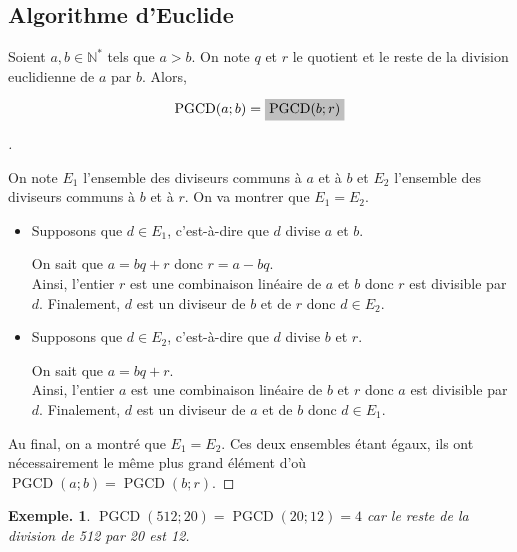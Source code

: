 \documentclass[12pt]{article}
\newcommand{\hideM}[1]{\mbox{\vphantom{$#1$}\smash{\colorbox{gray!50}{$\displaystyle #1$}}} }
\theoremstyle{break}
\newtheorem*{example}{Exemple.}
\newenvironment{demo}[1][\proofname]{%
  \begin{proof}[#1]$ $\newline
}{%
  \end{proof}
}
\begin{document}
\subsection{Algorithme d'Euclide}
\begin{proposition}{}{}
Soient $a, b \in \mathbb{N}^{*}$ tels que $a>b$. On note $q$ et $r$ le quotient et le reste de la division euclidienne de $a$ par $b$. Alors,

$$
\operatorname{PGCD}(a ; b)=\hideM{\operatorname{PGCD}(b ; r)}
$$
\end{proposition}

\begin{demo}
On note $E_{1}$ l'ensemble des diviseurs communs à $a$ et à $b$ et $E_{2}$ l'ensemble des diviseurs communs à $b$ et à $r$. On va montrer que $E_{1}=E_{2}$.

\begin{itemize}[noitemsep,topsep=0pt]
  \item Supposons que $d \in E_{1}$, c'est-à-dire que $d$ divise $a$ et $b$.

On sait que $a=b q+r$ donc $r=a-b q$.\\
Ainsi, l'entier $r$ est une combinaison linéaire de $a$ et $b$ donc $r$ est divisible par $d$. Finalement, $d$ est un diviseur de $b$ et de $r$ donc $d \in E_{2}$.

  \item Supposons que $d \in E_{2}$, c'est-à-dire que $d$ divise $b$ et $r$.

On sait que $a=b q+r$.\\
Ainsi, l'entier $a$ est une combinaison linéaire de $b$ et $r$ donc $a$ est divisible par $d$. Finalement, $d$ est un diviseur de $a$ et de $b$ donc $d \in E_{1}$.
\end{itemize}
Au final, on a montré que $E_{1}=E_{2}$. Ces deux ensembles étant égaux, ils ont nécessairement le même plus grand élément d'où $\operatorname{PGCD}(a ; b)=\operatorname{PGCD}(b ; r)$.
\end{demo}

\begin{example}
$\operatorname{PGCD}(512 ; 20)=\operatorname{PGCD}(20 ; 12)=4$ car le reste de la division de 512 par 20 est 12.
\end{example}
\end{document}
